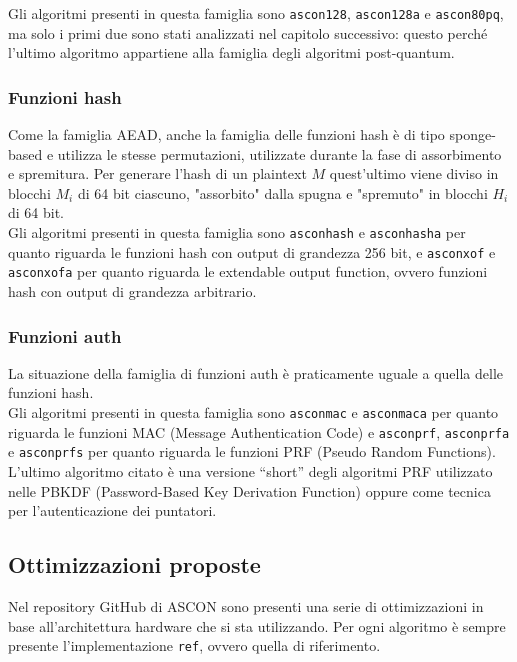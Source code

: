 \noindent Gli algoritmi presenti in questa famiglia sono \texttt{ascon128}, \texttt{ascon128a} e \texttt{ascon80pq}, ma solo i primi due sono stati analizzati nel capitolo successivo: questo perché l'ultimo algoritmo appartiene alla famiglia degli algoritmi post-quantum.

\subsubsection{Funzioni hash}

Come la famiglia AEAD, anche la famiglia delle funzioni hash è di tipo sponge-based e utilizza le stesse permutazioni, utilizzate durante la fase di assorbimento e spremitura. Per generare l'hash di un plaintext $M$ quest'ultimo viene diviso in blocchi $M_i$ di 64 bit ciascuno, "assorbito" dalla spugna e "spremuto" in blocchi $H_i$ di 64 bit. \\

\noindent Gli algoritmi presenti in questa famiglia sono \texttt{asconhash} e \texttt{asconhasha} per quanto riguarda le funzioni hash con output di grandezza 256 bit, e \texttt{asconxof} e \texttt{asconxofa} per quanto riguarda le extendable output function, ovvero funzioni hash con output di grandezza arbitrario\cite{ascon-specification}.

\subsubsection{Funzioni auth}

La situazione della famiglia di funzioni auth è praticamente uguale a quella delle funzioni hash. \\

\noindent Gli algoritmi presenti in questa famiglia sono \texttt{asconmac} e \texttt{asconmaca} per quanto riguarda le funzioni MAC (Message Authentication Code) e \texttt{asconprf}, \texttt{asconprfa} e \texttt{asconprfs} per quanto riguarda le funzioni PRF (Pseudo Random Functions)\cite{ascon-specification-pdf}. L'ultimo algoritmo citato è una versione ``short'' degli algoritmi PRF utilizzato nelle PBKDF (Password-Based Key Derivation Function) oppure come tecnica per l'autenticazione dei puntatori.

\subsection{Ottimizzazioni proposte}

Nel repository GitHub di ASCON sono presenti una serie di ottimizzazioni in base all'architettura hardware che si sta utilizzando. Per ogni algoritmo è sempre presente l'implementazione \texttt{ref}, ovvero quella di riferimento. \\

